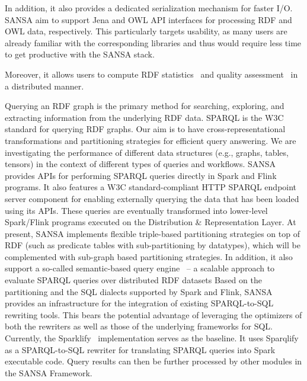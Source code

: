 In addition, it also provides a dedicated serialization mechanism for faster I/O. 
SANSA aim to support Jena and \gls{OWL} \gls{API} interfaces for processing \gls{RDF} and \gls{OWL} data, respectively.
This particularly targets usability, as many users are already familiar with the corresponding libraries and thus would require less time to get productive with the SANSA stack.

Moreover, it allows users to compute \gls{RDF} statistics~\cite{sejdiu-2018-dist-lod-stats-iswc} and quality assessment~\cite{sejdiu-2019-sansa-dist-quality-assessment-iswc} in a distributed manner.

Querying an \gls{RDF} graph is the primary method for searching, exploring, and extracting information from the underlying \gls{RDF} data.
\gls{SPARQL} is the \gls{W3C} standard for querying \gls{RDF} graphs.
Our aim is to have cross-representational transformations and partitioning strategies for efficient query answering. We are investigating the performance of different data structures (e.g., graphs, tables, tensors) in the context of different types of queries and workflows.
SANSA provides \gls{API}s for performing \gls{SPARQL} queries directly in Spark and Flink programs.
It also features a \gls{W3C} standard-compliant HTTP \gls{SPARQL} endpoint server component for enabling externally querying the data that has been loaded using its \gls{API}s. These queries are eventually transformed into lower-level Spark/Flink programs executed on the Distribution \& Representation Layer.
At present, SANSA implements flexible triple-based partitioning strategies on top of \gls{RDF} (such as predicate tables with sub-partitioning by datatypes), which will be complemented with sub-graph based partitioning strategies.
In addition, it also support a so-called semantic-based query engine~\cite{sejdiu-2019-sansa-semantic-based-semantics} -- a scalable approach to evaluate \gls{SPARQL} queries over distributed \gls{RDF} datasets
Based on the partitioning and the SQL dialects supported by Spark and Flink, SANSA provides an infrastructure for the integration of existing SPARQL-to-SQL rewriting tools. 
This bears the potential advantage of leveraging the optimizers of both the rewriters as well as those of the underlying frameworks for SQL.
Currently, the Sparklify~\cite{2019-sansa-sparklify-iswc} implementation serves as the baseline.
It uses Sparqlify as a SPARQL-to-SQL rewriter for translating \gls{SPARQL} queries into Spark executable code.
Query results can then be further processed by other modules in the SANSA Framework.

